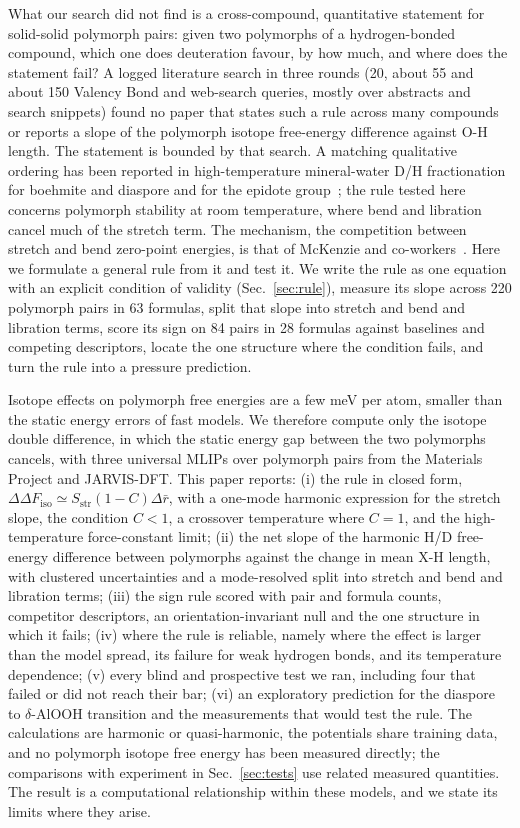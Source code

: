 \documentclass[aps,prmaterials,reprint,superscriptaddress,nofootinbib]{revtex4-2}
\newcommand{\ddF}{\Delta\Delta F_{\mathrm{iso}}}
\begin{document}
What our search did not find is a cross-compound, quantitative statement for solid-solid polymorph pairs: given two polymorphs of a hydrogen-bonded compound, which one does deuteration favour, by how much, and where does the statement fail? A logged literature search in three rounds (20, about 55 and about 150 Valency Bond and web-search queries, mostly over abstracts and search snippets) found no paper that states such a rule across many compounds or reports a slope of the polymorph isotope free-energy difference against O-H length. The statement is bounded by that search. A matching qualitative ordering has been reported in high-temperature mineral-water D/H fractionation for boehmite and diaspore and for the epidote group~\cite{Graham1980}; the rule tested here concerns polymorph stability at room temperature, where bend and libration cancel much of the stretch term. The mechanism, the competition between stretch and bend zero-point energies, is that of McKenzie and co-workers~\cite{McKenzie2014,McKenzie2015}. Here we formulate a general rule from it and test it. We write the rule as one equation with an explicit condition of validity (Sec.~\ref{sec:rule}), measure its slope across 220 polymorph pairs in 63 formulas, split that slope into stretch and bend and libration terms, score its sign on 84 pairs in 28 formulas against baselines and competing descriptors, locate the one structure where the condition fails, and turn the rule into a pressure prediction.

Isotope effects on polymorph free energies are a few meV per atom, smaller than the static energy errors of fast models. We therefore compute only the isotope double difference, in which the static energy gap between the two polymorphs cancels, with three universal MLIPs over polymorph pairs from the Materials Project and JARVIS-DFT. This paper reports:
(i) the rule in closed form, $\ddF \simeq S_{\mathrm{str}}(1-C)\Delta\bar r$, with a one-mode harmonic expression for the stretch slope, the condition $C<1$, a crossover temperature where $C=1$, and the high-temperature force-constant limit;
(ii) the net slope of the harmonic H/D free-energy difference between polymorphs against the change in mean X-H length, with clustered uncertainties and a mode-resolved split into stretch and bend and libration terms;
(iii) the sign rule scored with pair and formula counts, competitor descriptors, an orientation-invariant null and the one structure in which it fails;
(iv) where the rule is reliable, namely where the effect is larger than the model spread, its failure for weak hydrogen bonds, and its temperature dependence;
(v) every blind and prospective test we ran, including four that failed or did not reach their bar;
(vi) an exploratory prediction for the diaspore to $\delta$-AlOOH transition and the measurements that would test the rule.
The calculations are harmonic or quasi-harmonic, the potentials share training data, and no polymorph isotope free energy has been measured directly; the comparisons with experiment in Sec.~\ref{sec:tests} use related measured quantities. The result is a computational relationship within these models, and we state its limits where they arise.
\end{document}
